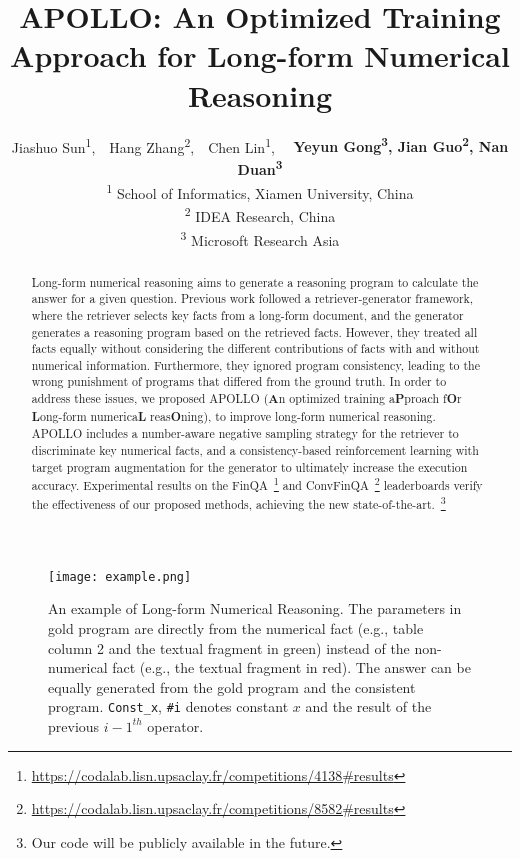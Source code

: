 \documentclass[11pt]{article}
\title{APOLLO: An Optimized Training Approach for Long-form Numerical Reasoning}
\author{
Jiashuo Sun\textsuperscript{\rm 1},\ \ 
Hang Zhang\textsuperscript{\rm 2},\ \
Chen Lin\textsuperscript{\rm 1}\footnotemark[1],\ \ 
\textbf{
Yeyun Gong\textsuperscript{\rm 3},
Jian Guo\textsuperscript{\rm 2},
Nan Duan\textsuperscript{\rm 3}}
\\
\textsuperscript{\rm 1} 
School of Informatics, Xiamen University, China\\
\textsuperscript{\rm 2}
IDEA Research, China\\
\textsuperscript{\rm 3}
Microsoft Research Asia
}
\begin{document}
\maketitle
\renewcommand{\thefootnote}{\fnsymbol{footnote}}


\begin{abstract}
Long-form numerical reasoning aims to generate a reasoning program to calculate the answer for a given question. Previous work followed a retriever-generator framework, where the retriever selects key facts from a long-form document, and the generator generates a reasoning program based on the retrieved facts. However, they treated all facts equally without considering the different contributions of facts with and without numerical information. Furthermore, they ignored program consistency, leading to the wrong punishment of programs that differed from the ground truth. In order to address these issues, we proposed APOLLO (\textbf{A}n optimized training a\textbf{P}proach f\textbf{O}r \textbf{L}ong-form numerica\textbf{L} reas\textbf{O}ning), to improve long-form numerical reasoning. APOLLO includes a number-aware negative sampling strategy for the retriever to discriminate key numerical facts, and a consistency-based reinforcement learning with target program augmentation for the generator to ultimately increase the execution accuracy. 
Experimental results on the FinQA~\footnote{\url{https://codalab.lisn.upsaclay.fr/competitions/4138\#results}} and ConvFinQA~\footnote{\url{https://codalab.lisn.upsaclay.fr/competitions/8582\#results}} leaderboards verify the effectiveness of our proposed methods, achieving the new state-of-the-art.~\footnote{Our code will be publicly available in the future.}

\end{abstract}

\begin{figure}[t]
    \centerline{\texttt{[image: example.png]}}
    \caption{An example of Long-form Numerical Reasoning. The parameters in gold program are directly from the numerical fact (e.g., \textcolor[RGB]{112,173,71}{table column 2 and the textual fragment in green}) instead of the non-numerical fact (e.g.,  \textcolor[RGB]{255,0,0}{the textual fragment in red}). The answer can be equally generated from the gold program and the \textcolor[RGB]{91,155,213}{consistent program}. \texttt{Const\_x}, \texttt{\#i} denotes constant $x$ and the result of the previous $i-1^{th}$ operator.}
    \label{figure:example}
\end{figure}
\end{document}
